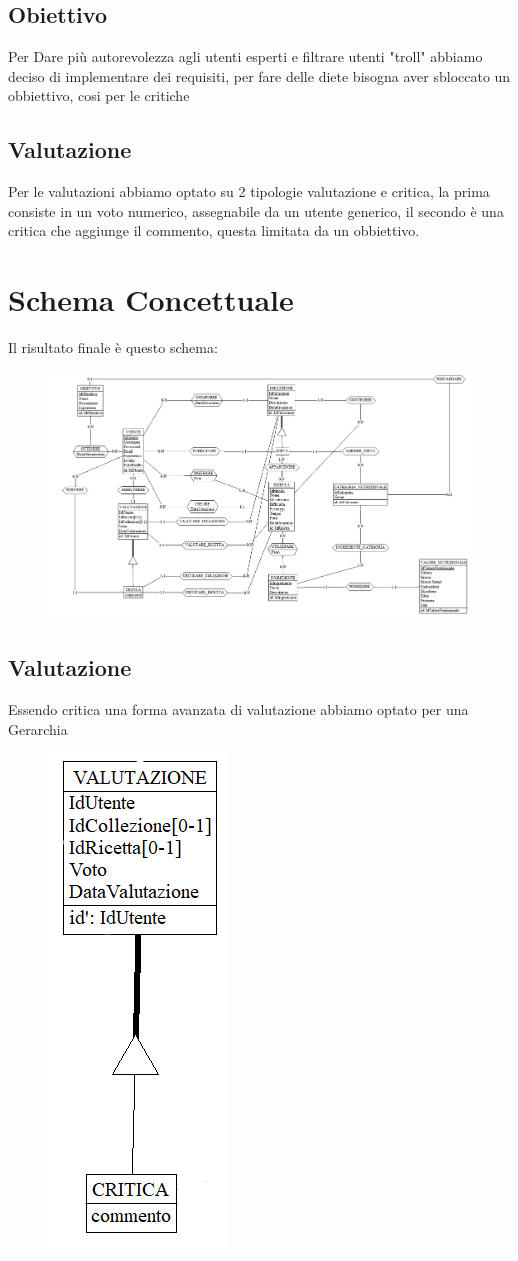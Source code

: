 ﻿\documentclass[a4paper,12pt]{report}
\begin{document}
\subsection{Obiettivo}
Per Dare più autorevolezza agli utenti esperti e
filtrare utenti "troll" abbiamo deciso di implementare dei requisiti,
per fare delle diete bisogna aver sbloccato un obbiettivo, 
cosi per le critiche
\subsection{Valutazione}
Per le valutazioni abbiamo optato su 2 tipologie
valutazione e critica, la prima consiste in un voto
numerico, assegnabile da un utente generico, il secondo è una critica
che aggiunge il commento, questa limitata da un obbiettivo.\\
\section{Schema Concettuale}
Il risultato finale è questo schema:
\begin{figure}[H]
    \centering
    \includegraphics[width=1\linewidth]{app_images/schema-concettuale.png}
\end{figure}

\subsection{Valutazione}
Essendo critica una forma avanzata di valutazione
abbiamo optato per una Gerarchia
\begin{figure}[H]
    \centering
    \includegraphics[width=0.2\linewidth]{app_images/valutazione-concettuale.png}
\end{figure}
\end{document}
